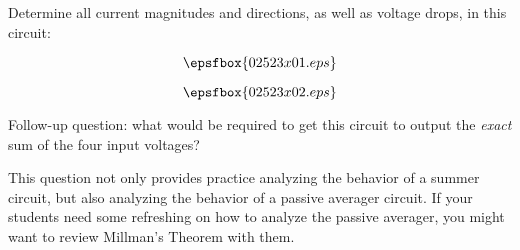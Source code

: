 

Determine all current magnitudes and directions, as well as voltage drops, in this circuit:

$$\epsfbox{02523x01.eps}$$







$$\epsfbox{02523x02.eps}$$

\vskip 10pt

Follow-up question: what would be required to get this circuit to output the {\it exact} sum of the four input voltages?







This question not only provides practice analyzing the behavior of a summer circuit, but also analyzing the behavior of a passive averager circuit.  If your students need some refreshing on how to analyze the passive averager, you might want to review Millman's Theorem with them.




